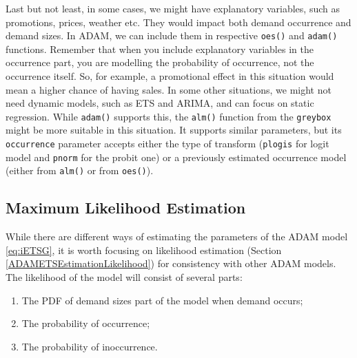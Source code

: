 \documentclass[
]{book}
\providecommand{\tightlist}{%
  \setlength{\itemsep}{0pt}\setlength{\parskip}{0pt}}
\theoremstyle{definition}
\theoremstyle{definition}
\theoremstyle{definition}
\theoremstyle{definition}
\theoremstyle{remark}
\begin{document}
Last but not least, in some cases, we might have explanatory variables, such as promotions, prices, weather etc. They would impact both demand occurrence and demand sizes. In ADAM, we can include them in respective \texttt{oes()} and \texttt{adam()} functions. Remember that when you include explanatory variables in the occurrence part, you are modelling the probability of occurrence, not the occurrence itself. So, for example, a promotional effect in this situation would mean a higher chance of having sales. In some other situations, we might not need dynamic models, such as ETS and ARIMA, and can focus on static regression. While \texttt{adam()} supports this, the \texttt{alm()} function from the \texttt{greybox} might be more suitable in this situation. It supports similar parameters, but its \texttt{occurrence} parameter accepts either the type of transform (\texttt{plogis} for logit model and \texttt{pnorm} for the probit one) or a previously estimated occurrence model (either from \texttt{alm()} or from \texttt{oes()}).

\hypertarget{iETSMLE}{%
\subsection{Maximum Likelihood Estimation}\label{iETSMLE}}

While there are different ways of estimating the parameters of the ADAM model \eqref{eq:iETSG}, it is worth focusing on likelihood estimation (Section \ref{ADAMETSEstimationLikelihood}) for consistency with other ADAM models. The likelihood of the model will consist of several parts:

\begin{enumerate}
\def\labelenumi{\arabic{enumi}.}
\tightlist
\item
  The PDF of demand sizes part of the model when demand occurs;
\item
  The probability of occurrence;
\item
  The probability of inoccurrence.
\end{enumerate}
\end{document}
